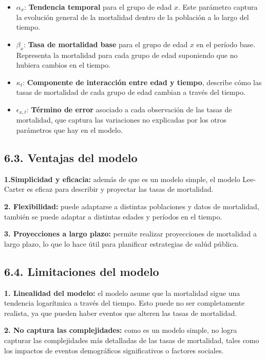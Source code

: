 \documentclass[
]{article}
\providecommand{\tightlist}{%
  \setlength{\itemsep}{0pt}\setlength{\parskip}{0pt}}
\begin{document}
\begin{itemize}
\tightlist
\item
  \(\alpha_x\): \textbf{Tendencia temporal} para el grupo de edad \(x\).
  Este parámetro captura la evolución general de la mortalidad dentro de
  la población a lo largo del tiempo.
\item
  \(\beta_x\): \textbf{Tasa de mortalidad base} para el grupo de edad
  \(x\) en el período base. Representa la mortalidad para cada grupo de
  edad suponiendo que no hubiera cambios en el tiempo.
\item
  \(\kappa_t\): \textbf{Componente de interacción entre edad y tiempo},
  describe cómo las tasas de mortalidad de cada grupo de edad cambian a
  través del tiempo.
\item
  \(\epsilon_{x,t}\): \textbf{Término de error} asociado a cada
  observación de las tasas de mortalidad, que captura las variaciones no
  explicadas por los otros parámetros que hay en el modelo.
\end{itemize}

\hypertarget{ventajas-del-modelo}{%
\subsection{6.3. Ventajas del modelo}\label{ventajas-del-modelo}}

\textbf{1.Simplicidad y eficacia:} además de que es un modelo simple, el
modelo Lee-Carter es eficaz para describir y proyectar las tasas de
mortalidad.

\textbf{2. Flexibilidad:} puede adaptarse a distintas poblaciones y
datos de mortalidad, también se puede adaptar a distintas edades y
períodos en el tiempo.

\textbf{3. Proyecciones a largo plazo:} permite realizar proyecciones de
mortalidad a largo plazo, lo que lo hace útil para planificar
estrategias de salúd pública.

\hypertarget{limitaciones-del-modelo}{%
\subsection{6.4. Limitaciones del
modelo}\label{limitaciones-del-modelo}}

\textbf{1. Linealidad del modelo:} el modelo asume que la mortalidad
sigue una tendencia logarítmica a través del tiempo. Esto puede no ser
completamente realista, ya que pueden haber eventos que alteren las
tasas de mortalidad.

\textbf{2. No captura las complejidades:} como es un modelo simple, no
logra capturar las complejidades más detalladas de las tasas de
mortalidad, tales como los impactos de eventos demográficos
significativos o factores sociales.
\end{document}
